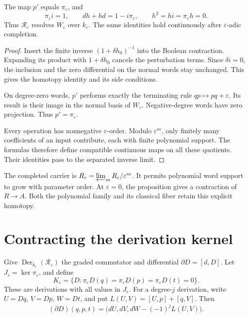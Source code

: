 \begin{proposition}\label{mht:prop:word-contraction}
The map $p'$ equals $\pi_\varepsilon$, and
\[
 \pi_\varepsilon i=1,\qquad
 dh+hd=1-i\pi_\varepsilon,
 \qquad h^2=hi=\pi_\varepsilon h=0.
\]
Thus $\mathcal R_\varepsilon$ resolves $W_\varepsilon$ over
$k_\varepsilon$. The same identities hold continuously after
$\varepsilon$-adic completion.
\end{proposition}

\begin{proof}
Insert the finite inverse $(1+\delta h_0)^{-1}$ into the Boolean
contraction. Expanding its product with $1+\delta h_0$ cancels
the perturbation terms. Since $\delta i=0$, the inclusion and
the zero differential on the normal words stay unchanged. This
gives the homotopy identity and its side conditions.

On degree-zero words, $p'$ performs exactly the terminating rule
$qp\mapsto pq+\varepsilon$. Its result is their image in the
normal basis of $W_\varepsilon$. Negative-degree words have zero
projection. Thus $p'=\pi_\varepsilon$.

Every operation has nonnegative $\varepsilon$-order. Modulo
$\varepsilon^m$, only finitely many coefficients of an input
contribute, each with finite polynomial support. The formulas
therefore define compatible continuous maps on all these
quotients. Their identities pass to the separated inverse limit.
\end{proof}

The completed carrier is
$\widehat{\mathcal R}_\varepsilon
=\varprojlim_m\mathcal R_\varepsilon/\varepsilon^m$.
It permits polynomial word support to grow with parameter order.
At $\varepsilon=0$, the proposition gives a contraction of
$R\to A$. Both the polynomial family and its classical fiber
retain this explicit homotopy.

\section{Contracting the derivation kernel}

Give $\operatorname{Der}_{k_\varepsilon}(\mathcal R_\varepsilon)$
the graded commutator and differential $\partial D=[d,D]$.
Let $J_\varepsilon=\ker\pi_\varepsilon$, and define
\[
 K_\varepsilon
 =\{D:\pi_\varepsilon D(q)
          =\pi_\varepsilon D(p)
          =\pi_\varepsilon D(t)=0\}.
\]
These are derivations with all values in $J_\varepsilon$.
For a degree-$j$ derivation, write
$U=Dq$, $V=Dp$, $W=Dt$, and put
$L(U,V)=[U,p]+[q,V]$. Then
\begin{equation}\label{mht:eq:derivation-kernel-differential}
 (\partial D)(q,p,t)
 =\bigl(dU,dV,dW-(-1)^jL(U,V)\bigr).
\end{equation}

